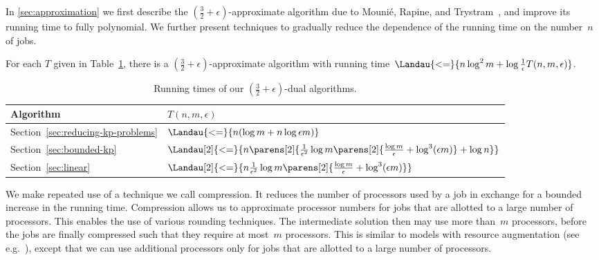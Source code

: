 In \cref{sec:approximation} we first describe the $(\frac{3}{2} + \epsilon)$-approximate algorithm
due to Mounié, Rapine, and Trystram~\cite{mounie07},
and improve its running time to fully polynomial.
We further present techniques to gradually reduce the dependence of the running time on the number~$n$ of jobs.
\begin{theorem}
  \label{thm:dual-approx}
  For each $T$ given in Table~\ref{tbl:running-times}, there is a $(\frac{3}{2} + \epsilon)$-approximate algorithm
  with running time~$\Landau{<=}{n \log^2 m + \log \frac{1}{\epsilon} T(n, m, \epsilon)}$.
  \begin{table}
    \caption{Running times of our $(\frac{3}{2} + \epsilon)$-dual algorithms.}
    \label{tbl:running-times}
    \centering
    \begin{tabular}{l l}
      \toprule
        Algorithm & $T(n, m, \epsilon)$ \\
      \midrule
        Section~\ref{sec:reducing-kp-problems} &
          $\Landau{<=}{n (\log m + n \log \epsilon m)}$ \\
        Section~\ref{sec:bounded-kp} &
          $\Landau[2]{<=}{n \parens[2]{\frac{1}{\epsilon^2} \log m \parens[2]{\frac{\log m}{\epsilon} + \log^3 (\epsilon m)} + \log n}}$ \\
        Section~\ref{sec:linear} &
          $\Landau[2]{<=}{n \frac{1}{\epsilon^2} \log m \parens[2]{\frac{\log m}{\epsilon} + \log^3 (\epsilon m)}}$ \\
      \bottomrule
    \end{tabular}
  \end{table}
\end{theorem}

We make repeated use of a technique we call compression.
It reduces the number of processors used by a job in exchange for a bounded increase in the running time.
Compression allows us to approximate processor numbers for jobs that are allotted to a large number of processors.
This enables the use of various rounding techniques.
The intermediate solution then may use more than~$m$ processors,
before the jobs are finally compressed such that they require at most~$m$ processors.
This is similar to models with resource augmentation (see e.g.~\cite{chekuri04}),
except that we can use additional processors only for jobs that are allotted to a large number of processors.
